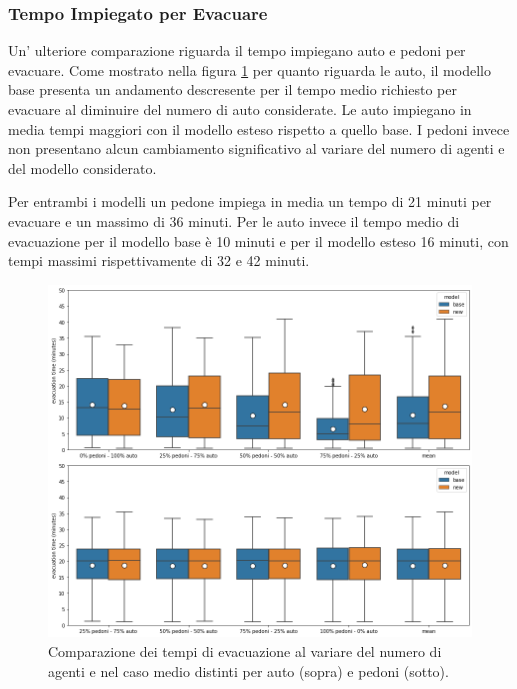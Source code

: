 \pagebreak

\subsubsection*{Tempo Impiegato per Evacuare}
Un' ulteriore comparazione riguarda il tempo impiegano auto e pedoni per evacuare.
Come mostrato nella figura \ref{fig:analisi-comparison-evtimes2} per quanto riguarda le auto, il modello base presenta un andamento descresente per il tempo medio richiesto per evacuare al diminuire del numero di auto considerate.
Le auto impiegano in media tempi maggiori con il modello esteso rispetto a quello base.
%
I pedoni invece non presentano alcun cambiamento significativo al variare del numero di agenti e del modello considerato. 

Per entrambi i modelli un pedone impiega in media un tempo di 21 minuti per evacuare e un massimo di 36 minuti.
Per le auto invece il tempo medio di evacuazione per il modello base è 10 minuti e per il modello esteso 16 minuti, 
con tempi massimi rispettivamente di 32 e 42 minuti.

\begin{figure}[ht]
    \centering
    \includegraphics[width=\textwidth]{images/analisi/comparison-evtimes2.png}
    \caption{
        Comparazione dei tempi di evacuazione al variare del numero di agenti e nel caso medio distinti per auto (sopra) e pedoni (sotto).
    }
    \label{fig:analisi-comparison-evtimes2}
\end{figure}

